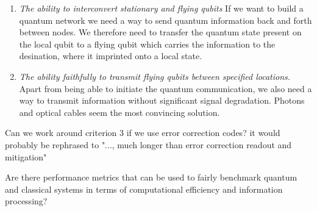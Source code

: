 \documentclass{alex_summary}
\begin{document}
\begin{enumerate}[leftmargin=*]
	\item \textit{The ability to interconvert stationary and flying qubits} If we want to build a quantum network we need a way to send quantum information back and forth between nodes. We therefore need to transfer the quantum state present on the local qubit to a flying qubit which carries the information to the desination, where it imprinted onto a local state. 	
	\item \textit{The ability faithfully to transmit flying qubits between specified locations.} Apart from being able to initiate the quantum communication, we also need a way to transmit information without significant signal degradation. Photons and optical cables seem the most convincing solution.
\end{enumerate}

\begin{question1}
	Can we work around criterion 3 if we use error correction codes? it would probably be rephrased to "..., much longer than error correction readout and mitigation"
\end{question1}


\begin{question3}
	Are there performance metrics that can be used to fairly benchmark quantum and classical systems in terms of computational efficiency and information processing?
\end{question3}

\printbibliography
\end{document}
